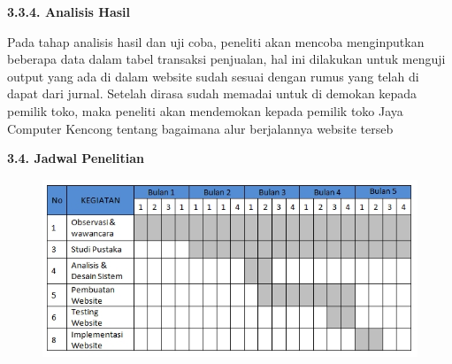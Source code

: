 \documentclass[11pt]{article}
\begin{document}
\textbf{3.3.4. Analisis Hasil}

Pada tahap analisis hasil dan uji coba, peneliti akan mencoba menginputkan beberapa data dalam tabel transaksi penjualan, hal ini dilakukan  untuk menguji output yang ada di dalam website sudah sesuai dengan rumus yang telah di dapat dari jurnal. Setelah dirasa sudah memadai untuk di demokan kepada pemilik toko, maka peneliti akan mendemokan kepada pemilik toko Jaya Computer Kencong tentang bagaimana alur berjalannya website terseb

\textbf{3.4. Jadwal Penelitian}

\begin{figure}[ht!]
  \centering
    \includegraphics[width=13cm]{gambar/Jadwal}
    \label{Jadwal}
\end{figure}
\end{document}
